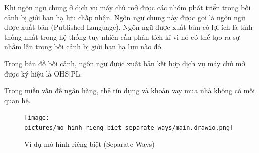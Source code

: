 Khi ngôn ngữ chung ở dịch vụ máy chủ mở được các nhóm phát triển trong bối cảnh bị giới hạn hạ lưu chấp nhận. Ngôn ngữ chung này được gọi là ngôn ngữ được xuất bản (Published Language). Ngôn ngữ được xuất bản có lợi ích là tính thống nhất trong hệ thống tuy nhiên cần phân tích kĩ vì nó có thể tạo ra sự nhầm lẫn trong bối cảnh bị giới hạn hạ lưu nào đó.

Trong bản đồ bối cảnh, ngôn ngữ được xuất bản kết hợp dịch vụ máy chủ mở được ký hiệu là OHS|PL.



















\begin{example} Trong miền vấn đề ngân hàng, thẻ tín dụng và khoản vay mua nhà không có mối quan hệ.

    \begin{figure}[H]

        \centering

        \texttt{[image: pictures/mo\_hinh\_rieng\_biet\_separate\_ways/main.drawio.png]}

        \caption{Ví dụ mô hình riêng biệt (Separate Ways)}

    \end{figure}

\end{example}

